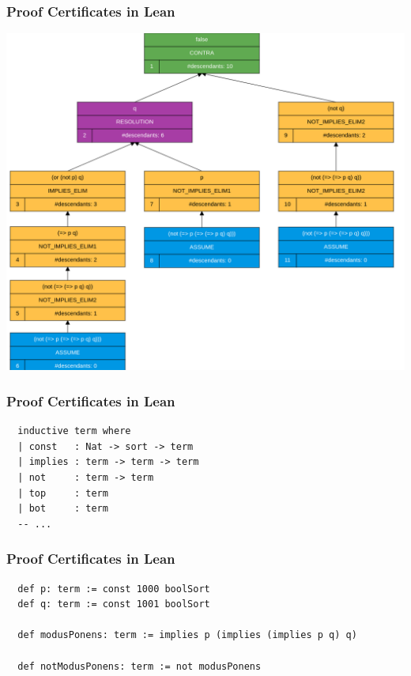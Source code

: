 \documentclass[usepdftitle=false,aspectratio=169,usenames,dvipsnames]{beamer}
\begin{document}
\begin{frame}
  \frametitle{Proof Certificates in Lean}
  \centering
  \includegraphics[height=0.8\textheight]{images/mp_cvc5_proof.png}
\end{frame}

\begin{frame}[fragile]
  \frametitle{Proof Certificates in Lean}
  \begin{verbatim}
  inductive term where
  | const   : Nat -> sort -> term
  | implies : term -> term -> term
  | not     : term -> term
  | top     : term
  | bot     : term
  -- ...
  \end{verbatim}
\end{frame}

\begin{frame}[fragile]
  \frametitle{Proof Certificates in Lean}
  \begin{verbatim}
  def p: term := const 1000 boolSort
  def q: term := const 1001 boolSort

  def modusPonens: term := implies p (implies (implies p q) q)

  def notModusPonens: term := not modusPonens
  \end{verbatim}
\end{frame}
\end{document}
